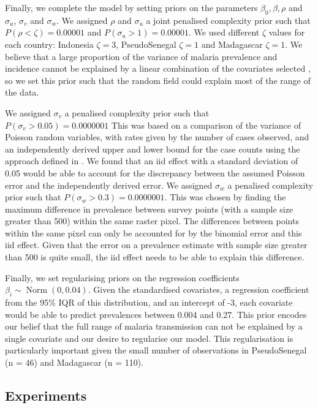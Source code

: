 \documentclass[10pt,letterpaper]{article}
\begin{document}
Finally, we complete the model by setting priors on the parameters $\beta_0, \beta, \rho$ and $\sigma_u$, $\sigma_v$ and $\sigma_w$.
We assigned $\rho$ and $\sigma_u$ a joint penalised complexity prior \cite{fuglstad2018constructing} such that $P(\rho < \zeta) = 0.00001$ and $P(\sigma_u > 1) = 0.00001$.
We used different $\zeta$ values for each country: Indonesia $\zeta = 3$, PseudoSenegal $\zeta = 1$ and Madagascar $\zeta = 1$.
We believe that a large proportion of the variance of malaria prevalence and incidence cannot be explained by a linear combination of the covariates selected \cite{bhatt2017improved}, so we set this prior such that the random field could explain most of the range of the data.

We assigned $\sigma_v$ a penalised complexity prior \cite{simpson2017penalising} such that $P(\sigma_v > 0.05) = 0.0000001$
This was based on a comparison of the variance of Poisson random variables, with rates given by the number of cases observed, and an independently derived upper and lower bound for the case counts using the approach defined in \cite{cibulskis2011worldwide}.
We found that an iid effect with a standard deviation of 0.05 would be able to account for the discrepancy between the assumed Poisson error and the independently derived error.
We assigned $\sigma_w$ a penalised complexity prior such that $P(\sigma_w > 0.3) = 0.0000001$. 
This was chosen by finding the maximum difference in prevalence between survey points (with a sample size greater than 500) within the same raster pixel.
The differences between points within the same pixel can only be accounted for by the binomial error and this iid effect.
Given that the error on a prevalence estimate with sample size greater than 500 is quite small, the iid effect needs to be able to explain this difference.

Finally, we set regularising priors on the regression coefficients $\beta_i \sim \operatorname{Norm}(0, 0.04)$. 
Given the standardised covariates, a regression coefficient from the 95\% IQR of this distribution, and an intercept of -3, each covariate would be able to predict prevalences between 0.004 and 0.27. 
This prior encodes our belief that the full range of malaria transmission can not be explained by a single covariate and our desire to regularise our model.
This regularisation is particularly important given the small number of observations in PseudoSenegal (n = 46) and Madagascar (n = 110).



\subsection*{Experiments}
\end{document}
